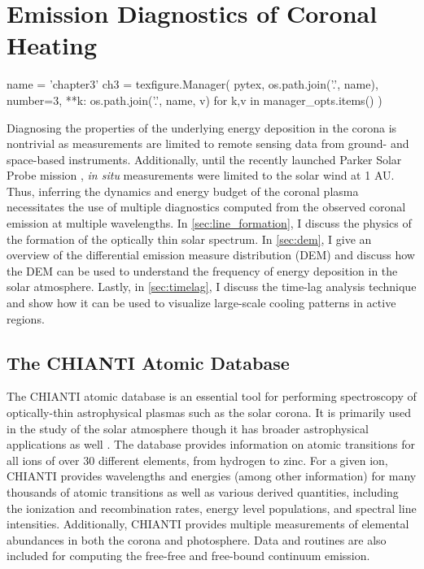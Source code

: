 \chapter{Emission Diagnostics of Coronal Heating}\label{ch:diagnostics}

\begin{pycode}[chapter3]
name = 'chapter3'
ch3 = texfigure.Manager(
    pytex,
    os.path.join('.', name),
    number=3,
    **{k: os.path.join('.', name, v) for k,v in manager_opts.items()}
)
\end{pycode}

Diagnosing the properties of the underlying energy deposition in the corona is nontrivial as measurements are limited to remote sensing data from ground- and space-based instruments. Additionally, until the recently launched Parker Solar Probe mission \citep{fox_solar_2016}, \textit{in situ} measurements were limited to the solar wind at 1 AU. Thus, inferring the dynamics and energy budget of the coronal plasma necessitates the use of multiple diagnostics computed from the observed coronal emission at multiple wavelengths. In \autoref{sec:line_formation}, I discuss the physics of the formation of the optically thin solar spectrum. In \autoref{sec:dem}, I give an overview of the differential emission measure distribution (DEM) and discuss how the DEM can be used to understand the frequency of energy deposition in the solar atmosphere. Lastly, in \autoref{sec:timelag}, I discuss the time-lag analysis technique and show how it can be used to visualize large-scale cooling patterns in active regions.

\section{The CHIANTI Atomic Database}\label{subsec:chianti}

The CHIANTI atomic database \citep{dere_chianti_1997,young_chianti_1998,landi_chianti_1999,dere_chianti-atomic_2001,landi_chianti-atomic_2002,young_chianti-atomic_2003,landi_chianti-atomic_2006,landi_chianti-atomic_2006-1,dere_chianti_2009,landi_chiantiatomic_2009,young_chiantiatomic_2009,landi_chiantiatomic_2012,landi_chiantiatomic_2013,del_zanna_chianti_2015,young_chianti_2016} is an essential tool for performing spectroscopy of optically-thin astrophysical plasmas such as the solar corona. It is primarily used in the study of the solar atmosphere though it has broader astrophysical applications as well \citep[see Figure 4 of][]{young_chianti_2016}. The database provides information on atomic transitions for all ions of over 30 different elements, from hydrogen to zinc. For a given ion, CHIANTI provides wavelengths and energies (among other information) for many thousands of atomic transitions as well as various derived quantities, including the ionization and recombination rates, energy level populations, and spectral line intensities. Additionally, CHIANTI provides multiple measurements of elemental abundances in both the corona and photosphere. Data and routines are also included for computing the free-free and free-bound continuum emission. 

